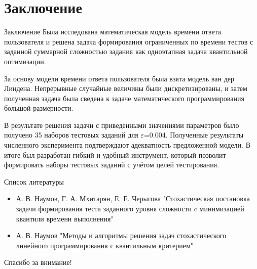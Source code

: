 \documentclass[aspectratio=169]{beamer}
\begin{document}
    \section{Заключение}
    \begin{frame}{Заключение}
        Была исследована математическая модель времени ответа пользователя и решена задача формирования ограниченных по времени тестов с заданной суммарной сложностью задания как одноэтапная задача квантильной оптимизации.

За основу модели времени ответа пользователя была взята модель ван дер Линдена. Непрерывные случайные величины были дискретизированы, и затем полученная задача была сведена к задаче математического программирования большой размерности.

В результате решения задачи с приведенными значениями параметров было получено 35 наборов тестовых заданий для $\varepsilon$=0.004. Полученные результаты численного эксперимента подтверждают адекватность предложенной модели. В итоге был разработан гибкий и удобный инструмент, который позволит формировать наборы тестовых заданий с учётом целей тестирования.

    \end{frame}
    
    \begin{frame}{Список литературы}
        \begin{itemize}
  			\item А. В. Наумов, Г. А. Мхитарян, Е. Е. Черыгова "Стохастическая постановка задачи формирования теста заданного уровня сложности c минимизацией квантили времени выполнения"
  			\item А. В. Наумов "Методы и алгоритмы решения задач стохастического линейного программирования с квантильным критерием"
		\end{itemize}
    \end{frame}

    \begin{frame}
        \centering
        \huge
        Спасибо за внимание!\\
    \end{frame}
\end{document}
